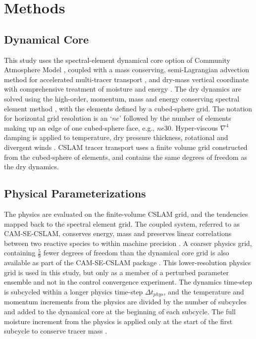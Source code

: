 \documentclass[times]{qjrms4}
\begin{document}
\section{Methods}

\subsection{Dynamical Core}

This study uses the spectral-element dynamical core option of Community Atmosphere Model \citep[CAM-SE;][]{DetAl2012IJHPCA}, coupled with a mass conserving, semi-Lagrangian advection method for accelerated multi-tracer transport \citep[CSLAM;][]{LTOUNGK2017MWR}, and dry-mass vertical coordinate with comprehensive treatment of moisture and energy \citep{LetAl2018JAMES}. The dry dynamics are solved using the high-order, momentum, mass and energy conserving spectral element method \citep{TF2010JCP}, with the elements defined by a cubed-sphere grid. The notation for horizontal grid resolution is an `$ne$' followed by the number of elements making up an edge of one cubed-sphere face, e.g., $ne30$. Hyper-viscous $\nabla^{4}$ damping is applied to temperature, dry pressure thickness, rotational and divergent winds \citep{LetAl2018JAMES}. CSLAM tracer transport uses a finite volume grid constructed from the cubed-sphere of elements, and contains the same degrees of freedom as the dry dynamics.

\subsection{Physical Parameterizations}

The physics are evaluated on the finite-volume CSLAM grid, and the tendencies mapped back to the spectral element grid. The coupled system, referred to as CAM-SE-CSLAM, conserves energy, mass and preserves linear correlations between two reactive species to within machine precision \citep{HL2018MWR}. A coarser physics grid, containing $\frac{5}{9}$ fewer degrees of freedom than the dynamical core grid is also available as part of the CAM-SE-CSLAM package \citep{HETAL2019JAMES}. This lower-resolution physics grid is used in this study, but only as a member of a perturbed parameter ensemble and not in the control convergence experiment. The dynamics time-step is subcycled within a longer physics time-step $\Delta t_{phys}$, and the temperature and momentum increments from the physics are divided by the number of subcycles and added to the dynamical core at the beginning of each subcycle. The full moisture increment from the physics is applied only at the start of the first subcycle to conserve tracer mass \citep[$ftype=2$ option in][]{LW2019JAMES}.
\end{document}
